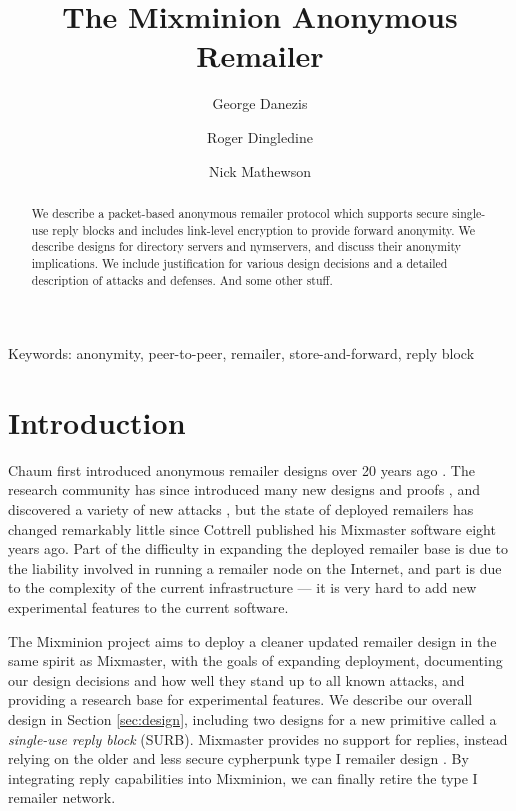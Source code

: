 \documentclass{llncs}
\begin{document}


\title{The Mixminion Anonymous Remailer}
\author{George Danezis \and Roger Dingledine \and Nick Mathewson}
\maketitle
\pagestyle{empty} 
  
\begin{abstract}

We describe a packet-based anonymous remailer protocol which supports
secure single-use reply blocks and includes link-level encryption to provide
forward anonymity. We describe designs for directory servers and nymservers,
and discuss their anonymity implications. We include justification
for various design decisions and a detailed description of attacks and
defenses. And some other stuff.

\end{abstract}

Keywords: anonymity, peer-to-peer, remailer, store-and-forward, reply block %


\section{Introduction}
\label{sec:intro}

Chaum first introduced anonymous remailer designs over 20 years ago
\cite{chaum-mix}. The research community has since introduced many new
designs and proofs \cite{big chain of cites?}, and discovered a variety
of new attacks \cite{more cites?}, but the
state of deployed remailers has changed remarkably little since Cottrell
published his Mixmaster software \cite{mixmaster-attacks} eight years
ago. Part of the difficulty in expanding the deployed remailer base is
due to the liability involved in running a remailer node on the Internet,
and part is due to the complexity of the current infrastructure ---
it is very hard to add new experimental features to the current software.

The Mixminion project aims to deploy a cleaner updated remailer design
in the same spirit as Mixmaster, with the goals of expanding deployment,
documenting our design decisions and how well they stand up to all known
attacks, and providing a research base for experimental features. We
describe our overall design in Section \ref{sec:design}, including two
designs for a new primitive called a \emph{single-use reply block}
(SURB).  Mixmaster provides no support for replies, instead relying
on the older and less secure cypherpunk type I remailer design
\cite{cypherpunk-remailer}. By integrating reply capabilities into
Mixminion, we can finally retire the type I remailer network.
\end{document}
